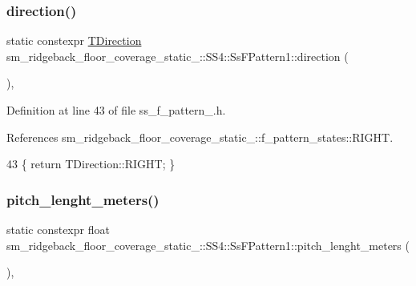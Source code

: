 \subsubsection{\texorpdfstring{direction()}{direction()}}
{\footnotesize\ttfamily static constexpr \hyperlink{namespacesm__ridgeback__floor__coverage__static__1_1_1f__pattern__states_ad85e4f6b7cecf87bbe0eef96a899de72}{T\+Direction} sm\+\_\+ridgeback\+\_\+floor\+\_\+coverage\+\_\+static\+\_\+::\+S\+S4\+::\+Ss\+F\+Pattern1\+::direction (\begin{DoxyParamCaption}{ }\end{DoxyParamCaption})\hspace{0.3cm}{\ttfamily [inline]}, {\ttfamily [static]}}



Definition at line 43 of file ss\+\_\+f\+\_\+pattern\+\_.\+h.



References sm\+\_\+ridgeback\+\_\+floor\+\_\+coverage\+\_\+static\+\_\+::f\+\_\+pattern\+\_\+states\+::\+R\+I\+G\+HT.


\begin{DoxyCode}
43 \{ \textcolor{keywordflow}{return} TDirection::RIGHT; \}
\end{DoxyCode}
\mbox{\label{structsm__ridgeback__floor__coverage__static__1_1_1SS4_1_1SsFPattern1_a5b8c47a8eedb90f7e1ff8d9dd0665687}} 
\subsubsection{\texorpdfstring{pitch\+\_\+lenght\+\_\+meters()}{pitch\_lenght\_meters()}}
{\footnotesize\ttfamily static constexpr float sm\+\_\+ridgeback\+\_\+floor\+\_\+coverage\+\_\+static\+\_\+::\+S\+S4\+::\+Ss\+F\+Pattern1\+::pitch\+\_\+lenght\+\_\+meters (\begin{DoxyParamCaption}{ }\end{DoxyParamCaption})\hspace{0.3cm}{\ttfamily [inline]}, {\ttfamily [static]}}



